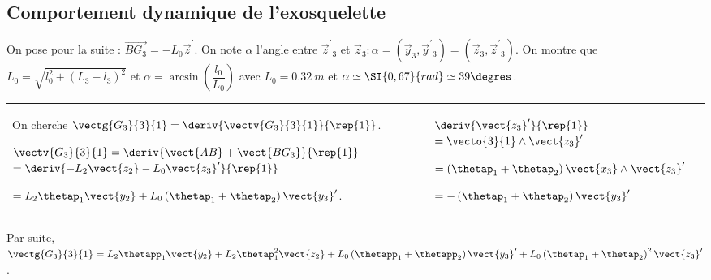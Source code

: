 
\subsection*{Comportement dynamique de l'exosquelette}

\ifprof
\else
On pose pour la suite : $\overrightarrow{B G_{3}}=-L_{0} \vec{z}^{\prime}$. On note $\alpha$ l'angle entre $\vec{z}^{\prime}{ }_{3}$ et $\vec{z}_{3}: \alpha=\left(\vec{y}_{3}, \vec{y}^{\prime}{ }_{3}\right)=\left(\vec{z}_{3}, \vec{z}^{\prime}{ }_{3}\right)$. On montre que $L_0 =\sqrt{l_0 ^2 + \left(L_3- l_3\right)^2}$ et $\alpha = \arcsin \left(\dfrac{l_0}{L_0}\right)$ avec $L_0= \SI{0,32}{m}$ et $\alpha \simeq \SI{0,67}{rad} \simeq 39\degres$.
\fi




\ifprof
\begin{corrige}
\begin{tabular}{p{.68\linewidth}| p{.3\linewidth}}
On cherche $\vectg{G_3}{3}{1} = \deriv{\vectv{G_3}{3}{1}}{\rep{1}}$.

$\vectv{G_3}{3}{1} = \deriv{\vect{AB}+\vect{BG_3}}{\rep{1}}$
$= \deriv{-L_2 \vect{z_2} -L_0 \vect{z_3}'}{\rep{1}}$

$=L_2 \thetap_1\vect{y_2}  +L_0  \left(\thetap_1 + \thetap_2 \right)\vect{y_3}'$.
&
$\deriv{\vect{z_3}'}{\rep{1}} $ $=\vecto{3}{1}\wedge \vect{z_3}' $

$= \left(\thetap_1 + \thetap_2 \right)\vect{x_3} \wedge \vect{z_3}' $

$= - \left(\thetap_1 + \thetap_2 \right)\vect{y_3}' $ 
\\
\end{tabular}

Par suite, 
$\vectg{G_3}{3}{1} = L_2 \thetapp_1\vect{y_2}  +L_2 \thetap_1^2\vect{z_2}  + L_0  \left(\thetapp_1 + \thetapp_2 \right)\vect{y_3}'+ L_0  \left(\thetap_1 + \thetap_2 \right)^2\vect{z_3}'$.


\end{corrige}
\else
\fi

